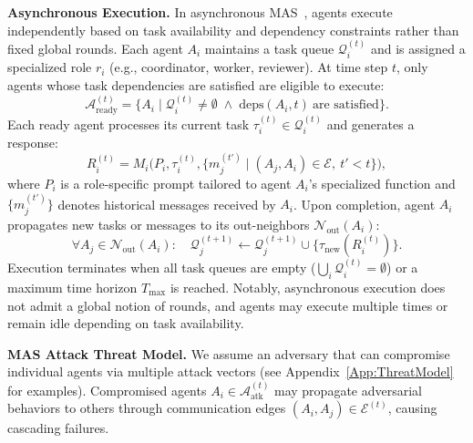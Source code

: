 \documentclass{article}
\theoremstyle{plain}
\theoremstyle{definition}
\theoremstyle{remark}
\begin{document}
\noindent\textbf{Asynchronous Execution.}
In asynchronous MAS~\cite{yu2025dyntaskmas,zhang2025multi,wu2024autogen}, 
agents execute independently based on task availability and dependency 
constraints rather than fixed global rounds.
Each agent $A_i$ maintains a task queue $\mathcal{Q}_i^{(t)}$ and is assigned a
specialized role $r_i$ (e.g., coordinator, worker, reviewer).
At time step $t$, only agents whose task dependencies are satisfied are eligible
to execute:
\begin{equation}
\mathcal{A}_{\text{ready}}^{(t)} =
\{A_i \mid \mathcal{Q}_i^{(t)} \neq \emptyset \;\land\; \text{deps}(A_i,t)\ \text{are satisfied}\}.
\end{equation}
Each ready agent processes its current task $\tau_i^{(t)} \in \mathcal{Q}_i^{(t)}$
and generates a response:
\begin{equation}
R_i^{(t)} =
M_i\big(P_i, \tau_i^{(t)}, \{m_j^{(t')} \mid (A_j, A_i) \in \mathcal{E},\ t' < t\}\big),
\end{equation}
where $P_i$ is a role-specific prompt tailored to agent $A_i$'s specialized 
function and $\{m_j^{(t')}\}$ denotes historical messages received by $A_i$.
Upon completion, agent $A_i$ propagates new tasks or messages to its out-neighbors
$\mathcal{N}_{\text{out}}(A_i)$:
\begin{equation}
\forall A_j \in \mathcal{N}_{\text{out}}(A_i):\quad
\mathcal{Q}_j^{(t+1)} \leftarrow \mathcal{Q}_j^{(t+1)} \cup \{\tau_{\text{new}}(R_i^{(t)})\}.
\end{equation}
Execution terminates when all task queues are empty
($\bigcup_i \mathcal{Q}_i^{(t)} = \emptyset$) or a maximum time horizon
$T_{\max}$ is reached.
Notably, asynchronous execution does not admit a global notion of rounds, and
agents may execute multiple times or remain idle depending on task availability.


\noindent\textbf{MAS Attack Threat Model.} 
We assume an adversary that can compromise individual agents via multiple 
attack vectors (see Appendix~\ref{App:ThreatModel} for examples).
Compromised agents $A_i \in \mathcal{A}_{\mathrm{atk}}^{(t)}$ may propagate 
adversarial behaviors to others through communication edges 
$(A_i, A_j) \in \mathcal{E}^{(t)}$, causing cascading failures.
\end{document}
